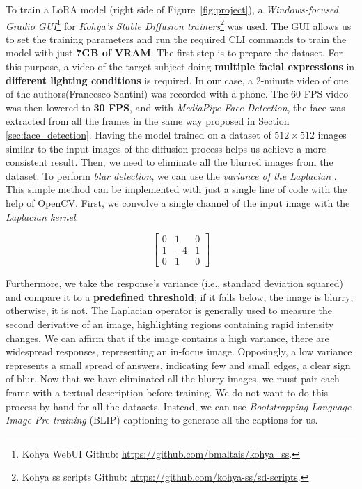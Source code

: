 \documentclass[preprint]{elsarticle}
\begin{document}
To train a LoRA model (right side of Figure~\ref{fig:project}), a \emph{Windows-focused Gradio GUI}\footnote{Kohya WebUI Github: \url{https://github.com/bmaltais/kohya_ss}.} for \emph{Kohya's Stable Diffusion trainers}\footnote{Kohya ss scripts Github: \url{https://github.com/kohya-ss/sd-scripts}.} was used. 
The GUI allows us to set the training parameters and run the required 
CLI commands to train the model with just \textbf{7GB of VRAM}. 
The first step is to prepare the dataset. For this purpose, 
a video of the target subject doing \textbf{multiple facial expressions} in \textbf{different lighting conditions} 
is required. In our case, a 2-minute video of one of the authors(Francesco Santini) was recorded with a phone. 
The 60 FPS video was then lowered to \textbf{30 FPS}, and with \emph{MediaPipe Face Detection},
the face was extracted from all the frames in the same way proposed in Section \ref{sec:face_detection}.
Having the model trained on a dataset of $512\times 512$ images similar to the input images 
of the diffusion process helps us achieve a more consistent result. 
Then, we need to eliminate all the blurred images from the dataset. 
To perform \emph{blur detection}, we can use the \emph{variance of the Laplacian} \cite{903548}. 
This simple method can be implemented with just a single line of code with the help of OpenCV. 
First, we convolve a single channel of the input image with the \emph{Laplacian kernel}:

\begin{equation}
	\begin{bmatrix}
		0 & 1 & 0\\
		1 & -4 & 1\\
		0 & 1 & 0
	\end{bmatrix}
\end{equation}

Furthermore, we take the response's variance (i.e., standard deviation squared) 
and compare it to a \textbf{predefined threshold}; if it falls below, the image is blurry; otherwise, it is not.
The Laplacian operator is generally used to measure the second derivative of an image, 
highlighting regions containing rapid intensity changes. 
We can affirm that if the image contains a high variance, there are widespread responses, 
representing an in-focus image. Opposingly, a  low variance represents a small spread of answers, 
indicating few and small edges, a clear sign of blur.
Now that we have eliminated all the blurry images, 
we must pair each frame with a textual description before training. 
We do not want to do this process by hand for all the datasets. 
Instead, we can use \emph{Bootstrapping Language-Image Pre-training} (BLIP) captioning \cite{li2022blip} 
to generate all the captions for us. 
\end{document}

